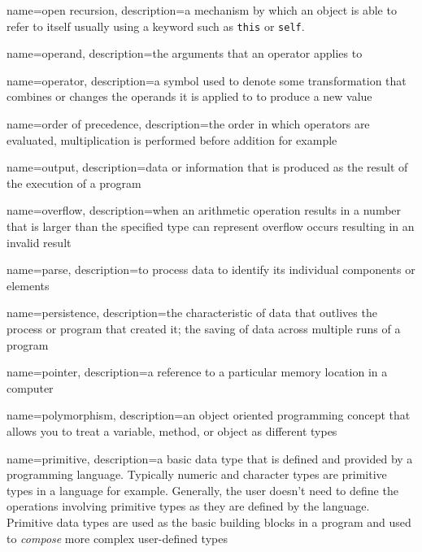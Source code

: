 {
  name=open recursion,
  description={a mechanism by which an object is able to refer to itself
  usually using a keyword such as \texttt{this} or 
  \texttt{self}.}
}

{
  name=operand,
  description={the arguments that an operator applies to}
}

{
  name=operator,
  description={a symbol used to denote some transformation that combines or changes the operands it is applied to to produce a new value}
}

{
  name=order of precedence,
  description={the order in which operators are evaluated, multiplication is performed before addition for example}
}

{
  name=output,
  description={data or information that is produced as the result of the execution of a program}
}

{
  name=overflow,
  description={when an arithmetic operation results in a number that is larger than the specified type can represent overflow occurs resulting in an invalid result}
}

{
  name=parse,
  description={to process data to identify its individual components or elements}
}

{
  name=persistence,
  description={the characteristic of data that outlives the process or program that created it; the saving of data across multiple runs of a program}
}

{
  name=pointer,
  description={a reference to a particular memory location in a computer}
}

{
  name=polymorphism,
  description={an object oriented programming concept that allows you to treat a variable, method, or object as different types}
}

{
  name=primitive,
  description={a basic data type that is defined and provided by a programming language.  Typically numeric and character types are primitive types in a language for example.  Generally, the user doesn't need to define the operations involving primitive types as they are defined by the language.  Primitive data types are used as the basic building blocks in a program and used to \emph{compose} more complex user-defined types}
}

